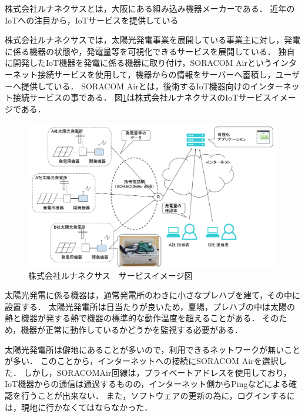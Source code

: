 株式会社ルナネクサスとは，大阪にある組み込み機器メーカーである．
近年のIoTへの注目から，IoTサービスを提供している

株式会社ルナネクサスでは，太陽光発電事業を展開している事業主に対し，発電に係る機器の状態や，発電量等を可視化できるサービスを展開している．
独自に開発したIoT機器を発電に係る機器に取り付け，SORACOM Airというインターネット接続サービスを使用して，機器からの情報をサーバーへ蓄積し，ユーザーへ提供している．
SORACOM Airとは，後術するIoT機器向けのインターネット接続サービスの事である．
図\ref{fig:lunafig}は株式会社ルナネクサスのIoTサービスイメージである．
\begin{figure}[htbp]
\includegraphics[width=16cm]{images/lunafig.png}
\caption{株式会社ルナネクサス　サービスイメージ図}
\label{fig:lunafig}
\end{figure}



太陽光発電に係る機器は，通常発電所のわきに小さなプレハブを建て，その中に設置する．
太陽光発電所は日当たりが良いため，夏場，プレハブの中は太陽の熱と機器が発する熱で機器の標準的な動作温度を超えることがある．
そのため，機器が正常に動作しているかどうかを監視する必要がある．

太陽光発電所は僻地にあることが多いので，利用できるネットワークが無いことが多い．
このことから，インターネットへの接続にSORACOM Airを選択した．
しかし，SORACOMAir回線は，プライベートアドレスを使用しており，IoT機器からの通信は通過するものの，インターネット側からPingなどによる確認を行うことが出来ない．
また，ソフトウェアの更新の為に，ログインするには，現地に行かなくてはならなかった．

